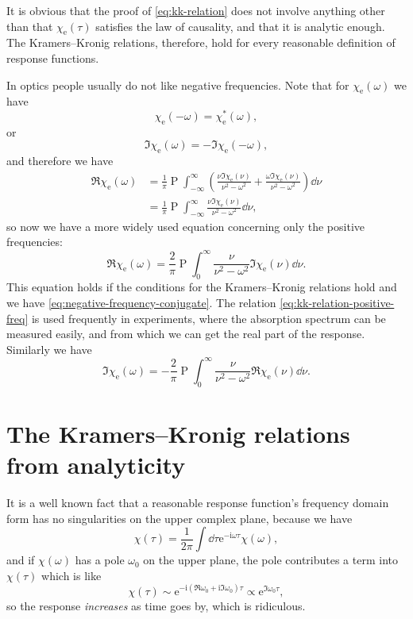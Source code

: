 \documentclass[hyperref, a4paper]{article}
\DeclareMathOperator{\primevalue}{P}
\newcommand*{\ii}{\mathrm{i}}
\newcommand*{\ee}{\mathrm{e}}
\begin{document}
It is obvious that the proof of \eqref{eq:kk-relation} does not involve anything other than that $\chi_\text{e}(\tau)$ satisfies the law of causality, and that it is analytic enough.
The Kramers–Kronig relations, therefore, hold for every reasonable definition of response functions.

In optics people usually do not like negative frequencies. Note that for $\chi_\text{e}(\omega)$ we have 
\begin{equation}
    \chi_\text{e}(-\omega) = \chi_\text{e}^*(\omega),
    \label{eq:negative-frequency-conjugate}
\end{equation}
or 
\[
    \Im \chi_\text{e}(\omega) = - \Im \chi_\text{e}(- \omega),
\]
and therefore we have 
\[
    \begin{aligned}
        \Re \chi_\text{e}(\omega) &= \frac{1}{\pi} \primevalue \int_{-\infty}^\infty \left( \frac{ \nu \Im \chi_\text{e}(\nu)}{\nu^2 - \omega^2} + \frac{ \omega \Im \chi_\text{e}(\nu)}{\nu^2 - \omega^2} \right) \dd{\nu} \\
        &= \frac{1}{\pi} \primevalue \int_{-\infty}^\infty \frac{ \nu \Im \chi_\text{e}(\nu)}{\nu^2 - \omega^2} \dd{\nu} ,
    \end{aligned}
\]
so now we have a more widely used equation concerning only the positive frequencies: 
\begin{equation}
    \Re \chi_\text{e}(\omega) = \frac{2}{\pi} \primevalue \int_0^\infty \frac{\nu}{\nu^2 - \omega^2} \Im \chi_\text{e}(\nu) \dd{\nu}.
    \label{eq:kk-relation-positive-freq}
\end{equation}
This equation holds if the conditions for the Kramers–Kronig relations hold and we have \eqref{eq:negative-frequency-conjugate}.
The relation \eqref{eq:kk-relation-positive-freq} is used frequently in experiments, where the absorption spectrum can be measured easily, and from which we can get the real part of the response.
Similarly we have 
\begin{equation}
    \Im \chi_\text{e}(\omega) = - \frac{2}{\pi} \primevalue \int_0^\infty \frac{\nu}{\nu^2 - \omega^2} \Re \chi_\text{e}(\nu) \dd{\nu}.
    \label{eq:kk-relation-positive-freq-im}
\end{equation}

\section{The Kramers–Kronig relations from analyticity}

It is a well known fact that a reasonable response function's frequency domain form has no singularities on the upper complex plane, because we have 
\[
    \chi(\tau) = \frac{1}{2\pi} \int \dd{\tau} \ee^{- \ii \omega \tau} \chi(\omega),
\]
and if $\chi(\omega)$ has a pole $\omega_0$ on the upper plane, the pole contributes a term into $\chi(\tau)$ which is like 
\[
    \chi(\tau) \sim \ee^{- \ii (\Re \omega_0 + \ii \Im \omega_0) \tau} \propto \ee^{\Im \omega_0 \tau},
\]
so the response \emph{increases} as time goes by, which is ridiculous.
\end{document}
